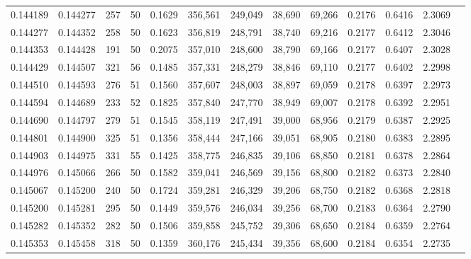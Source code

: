 \begin{tabular}{rrrrrrrrrrrrr}
0.144189 & 0.144277 &   257 &  50 &                                     0.1629 & 356,561 & 249,049 &  38,690 &  69,266 & 0.2176 & 0.6416 & 2.3069 \\
0.144277 & 0.144352 &   258 &  50 &                                     0.1623 & 356,819 & 248,791 &  38,740 &  69,216 & 0.2177 & 0.6412 & 2.3046 \\
0.144353 & 0.144428 &   191 &  50 &                                     0.2075 & 357,010 & 248,600 &  38,790 &  69,166 & 0.2177 & 0.6407 & 2.3028 \\
0.144429 & 0.144507 &   321 &  56 &                                     0.1485 & 357,331 & 248,279 &  38,846 &  69,110 & 0.2177 & 0.6402 & 2.2998 \\
0.144510 & 0.144593 &   276 &  51 &                                     0.1560 & 357,607 & 248,003 &  38,897 &  69,059 & 0.2178 & 0.6397 & 2.2973 \\
0.144594 & 0.144689 &   233 &  52 &                                     0.1825 & 357,840 & 247,770 &  38,949 &  69,007 & 0.2178 & 0.6392 & 2.2951 \\
0.144690 & 0.144797 &   279 &  51 &                                     0.1545 & 358,119 & 247,491 &  39,000 &  68,956 & 0.2179 & 0.6387 & 2.2925 \\
0.144801 & 0.144900 &   325 &  51 &                                     0.1356 & 358,444 & 247,166 &  39,051 &  68,905 & 0.2180 & 0.6383 & 2.2895 \\
0.144903 & 0.144975 &   331 &  55 &                                     0.1425 & 358,775 & 246,835 &  39,106 &  68,850 & 0.2181 & 0.6378 & 2.2864 \\
0.144976 & 0.145066 &   266 &  50 &                                     0.1582 & 359,041 & 246,569 &  39,156 &  68,800 & 0.2182 & 0.6373 & 2.2840 \\
0.145067 & 0.145200 &   240 &  50 &                                     0.1724 & 359,281 & 246,329 &  39,206 &  68,750 & 0.2182 & 0.6368 & 2.2818 \\
0.145200 & 0.145281 &   295 &  50 &                                     0.1449 & 359,576 & 246,034 &  39,256 &  68,700 & 0.2183 & 0.6364 & 2.2790 \\
0.145282 & 0.145352 &   282 &  50 &                                     0.1506 & 359,858 & 245,752 &  39,306 &  68,650 & 0.2184 & 0.6359 & 2.2764 \\
0.145353 & 0.145458 &   318 &  50 &                                     0.1359 & 360,176 & 245,434 &  39,356 &  68,600 & 0.2184 & 0.6354 & 2.2735 \\

\end{tabular}
